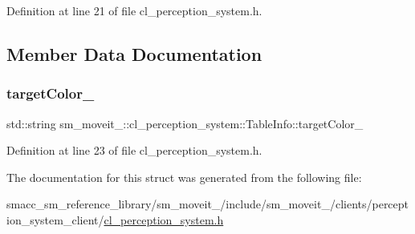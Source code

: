 Definition at line 21 of file cl\+\_\+perception\+\_\+system.\+h.



\subsection{Member Data Documentation}
\mbox{\label{structsm__moveit__4_1_1cl__perception__system_1_1TableInfo_ad4361daafb35048ab3d507850f02eeba}} 
\subsubsection{\texorpdfstring{target\+Color\+\_\+}{targetColor\_}}
{\footnotesize\ttfamily std\+::string sm\+\_\+moveit\+\_\+::cl\+\_\+perception\+\_\+system\+::\+Table\+Info\+::target\+Color\+\_\+}



Definition at line 23 of file cl\+\_\+perception\+\_\+system.\+h.



The documentation for this struct was generated from the following file\+:\begin{DoxyCompactItemize}
\item 
smacc\+\_\+sm\+\_\+reference\+\_\+library/sm\+\_\+moveit\+\_/include/sm\+\_\+moveit\+\_/clients/perception\+\_\+system\+\_\+client/\hyperlink{4_2include_2sm__moveit__4_2clients_2perception__system__client_2cl__perception__system_8h}{cl\+\_\+perception\+\_\+system.\+h}\end{DoxyCompactItemize}
